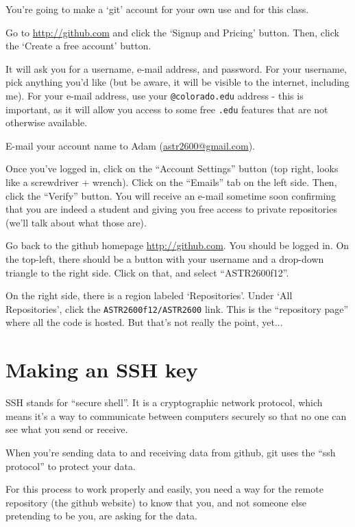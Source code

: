 \documentclass{article}
\begin{document}
\begin{spacing}{1.0}
You're going to make a `git' account for your own use and for this class.

Go to \url{http://github.com} and click the `Signup and Pricing' button.
Then, click the `Create a free account' button.

It will ask you for a username, e-mail address, and password.  For your
username, pick anything you'd like (but be aware, it will be visible to the
internet, including me).  For your e-mail address, use your
\texttt{@colorado.edu} address - this is important, as it will allow you access
to some free \texttt{.edu} features that are not otherwise available.

E-mail your account name to Adam (\url{astr2600@gmail.com}).  

Once you've logged in, click on the “Account Settings” button (top right, looks
like a screwdriver + wrench).  Click on the “Emails” tab on the left side.
Then, click the “Verify” button.  You will receive an e-mail sometime soon
confirming that you are indeed a student and giving you free access to private
repositories (we'll talk about what those are).

Go back to the github homepage \url{http://github.com}.  You should be logged in.
On the top-left, there should be a button with your username and a drop-down
triangle to the right side.  Click on that, and select “ASTR2600f12”.

On the right side, there is a region labeled `Repositories'.  Under `All
Repositories', click the \texttt{ASTR2600f12/ASTR2600} link.  This is the
“repository page” where all the code is hosted.  But that's not really the 
point, yet...

\section{Making an SSH key}

SSH stands for ``secure shell''.  It is a cryptographic network protocol, which
means it's a way to communicate between computers securely so that no one can
see what you send or receive.

When you're sending data to and receiving data from github, git uses the ``ssh
protocol'' to protect your data.

For this process to work properly and easily, you need a way for the remote repository
(the github website) to know that you, and not someone else pretending to be you, are
asking for the data.


\end{spacing}
\end{document}
